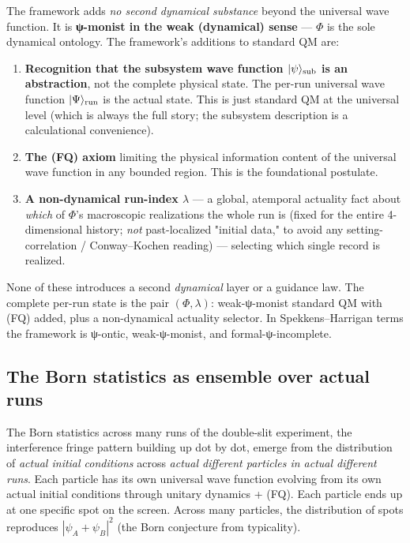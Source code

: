 \documentclass[11pt,a4paper]{article}
\begin{document}
The framework adds \emph{no second dynamical substance} beyond the universal wave function. It is \textbf{ψ-monist in the weak (dynamical) sense} — $\Phi$ is the sole dynamical ontology. The framework's additions to standard QM are:

\begin{enumerate}
  \item \textbf{Recognition that the subsystem wave function $|\psi\rangle_{\rm sub}$ is an abstraction}, not the complete physical state. The per-run universal wave function $|\Psi\rangle_{\rm run}$ is the actual state. This is just standard QM at the universal level (which is always the full story; the subsystem description is a calculational convenience).
  \item \textbf{The (FQ) axiom} limiting the physical information content of the universal wave function in any bounded region. This is the foundational postulate.
  \item \textbf{A non-dynamical run-index $\lambda$} — a global, atemporal actuality fact about \emph{which} of $\Phi$'s macroscopic realizations the whole run is (fixed for the entire 4-dimensional history; \emph{not} past-localized "initial data," to avoid any setting-correlation / Conway–Kochen reading) — selecting which single record is realized.
\end{enumerate}

None of these introduces a second \emph{dynamical} layer or a guidance law. The complete per-run state is the pair $(\Phi, \lambda)$: weak-ψ-monist standard QM with (FQ) added, plus a non-dynamical actuality selector. In Spekkens–Harrigan terms the framework is ψ-ontic, weak-ψ-monist, and formal-ψ-incomplete.

\subsection{The Born statistics as ensemble over actual runs}

The Born statistics across many runs of the double-slit experiment, the interference fringe pattern building up dot by dot, emerge from the distribution of \emph{actual initial conditions} across \emph{actual different particles in actual different runs}. Each particle has its own universal wave function evolving from its own actual initial conditions through unitary dynamics + (FQ). Each particle ends up at one specific spot on the screen. Across many particles, the distribution of spots reproduces $|\psi_A + \psi_B|^2$ (the Born conjecture from typicality).
\end{document}
